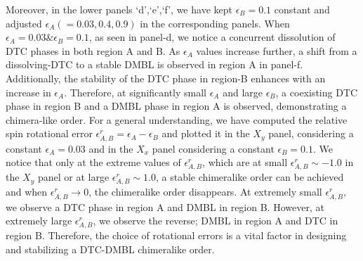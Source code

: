 \documentclass[12pt]{iopart}
\begin{document}
Moreover, in the lower panels `d',`e',`f', we have kept $\epsilon_{B} = 0.1$ constant and adjusted $\epsilon_{A}(=0.03,0.4,0.9)$ in the corresponding panels. When $\epsilon_{A}=0.03 \& \epsilon_{B}=0.1$, as seen in panel-d, we notice a concurrent dissolution of DTC phases in both region A and B. As $\epsilon_{A}$ values increase further, a shift from a dissolving-DTC to a stable DMBL is observed in region A in panel-f. Additionally, the stability of the DTC phase in region-B enhances with an increase in $\epsilon_{A}$. Therefore, at significantly small $\epsilon_{A}$ and large $\epsilon_{B}$, a coexisting DTC phase in region B and a DMBL phase in region A is observed, demonstrating a chimera-like order. For a general understanding, we have computed the relative spin rotational error $\epsilon^r_{A,B} = \epsilon_{A}-\epsilon_{B}$ and plotted it in the $X_y$ panel, considering a constant $\epsilon_{A} = 0.03$ and in the $X_x$ panel considering a constant $\epsilon_{B} = 0.1$. We notice that only at the extreme values of $\epsilon^r_{A,B}$, which are at small $\epsilon^r_{A,B} \sim -1.0$ in the $X_y$ panel or at large $\epsilon^r_{A,B} \sim 1.0$, a stable chimeralike order can be achieved and when $\epsilon^r_{A,B}\rightarrow 0$, the chimeralike order disappears. At extremely small $\epsilon^r_{A,B}$, we observe a DTC phase in region A and DMBL in region B. However, at extremely large $\epsilon^r_{A,B}$, we observe the reverse; DMBL in region A and DTC in region B. Therefore, the choice of rotational errors is a vital factor in designing and stabilizing a DTC-DMBL chimeralike order.
\end{document}
